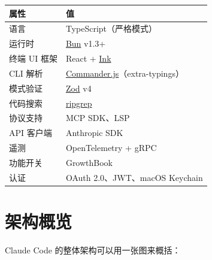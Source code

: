\begin{longtable}{ll}
\toprule
属性 & 值 \\
\midrule
语言 & TypeScript（严格模式） \\
运行时 & \href{https://bun.sh}{Bun} v1.3+ \\
终端 UI 框架 & React + \href{https://github.com/vadimdemedes/ink}{Ink} \\
CLI 解析 & \href{https://github.com/tj/commander.js}{Commander.js}（extra-typings） \\
模式验证 & \href{https://zod.dev}{Zod} v4 \\
代码搜索 & \href{https://github.com/BurntSushi/ripgrep}{ripgrep} \\
协议支持 & MCP SDK、LSP \\
API 客户端 & Anthropic SDK \\
遥测 & OpenTelemetry + gRPC \\
功能开关 & GrowthBook \\
认证 & OAuth 2.0、JWT、macOS Keychain \\
\bottomrule
\end{longtable}

\section{架构概览}

Claude Code 的整体架构可以用一张图来概括：

